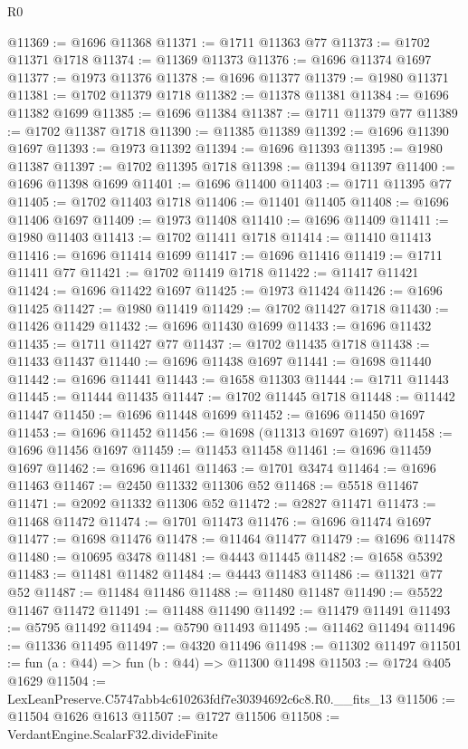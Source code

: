 \begin{lexlean}{R0}
\begin{coremodule}
@11369 := @1696 @11368
@11371 := @1711 @11363 @77
@11373 := @1702 @11371 @1718
@11374 := @11369 @11373
@11376 := @1696 @11374 @1697
@11377 := @1973 @11376
@11378 := @1696 @11377
@11379 := @1980 @11371
@11381 := @1702 @11379 @1718
@11382 := @11378 @11381
@11384 := @1696 @11382 @1699
@11385 := @1696 @11384
@11387 := @1711 @11379 @77
@11389 := @1702 @11387 @1718
@11390 := @11385 @11389
@11392 := @1696 @11390 @1697
@11393 := @1973 @11392
@11394 := @1696 @11393
@11395 := @1980 @11387
@11397 := @1702 @11395 @1718
@11398 := @11394 @11397
@11400 := @1696 @11398 @1699
@11401 := @1696 @11400
@11403 := @1711 @11395 @77
@11405 := @1702 @11403 @1718
@11406 := @11401 @11405
@11408 := @1696 @11406 @1697
@11409 := @1973 @11408
@11410 := @1696 @11409
@11411 := @1980 @11403
@11413 := @1702 @11411 @1718
@11414 := @11410 @11413
@11416 := @1696 @11414 @1699
@11417 := @1696 @11416
@11419 := @1711 @11411 @77
@11421 := @1702 @11419 @1718
@11422 := @11417 @11421
@11424 := @1696 @11422 @1697
@11425 := @1973 @11424
@11426 := @1696 @11425
@11427 := @1980 @11419
@11429 := @1702 @11427 @1718
@11430 := @11426 @11429
@11432 := @1696 @11430 @1699
@11433 := @1696 @11432
@11435 := @1711 @11427 @77
@11437 := @1702 @11435 @1718
@11438 := @11433 @11437
@11440 := @1696 @11438 @1697
@11441 := @1698 @11440
@11442 := @1696 @11441
@11443 := @1658 @11303
@11444 := @1711 @11443
@11445 := @11444 @11435
@11447 := @1702 @11445 @1718
@11448 := @11442 @11447
@11450 := @1696 @11448 @1699
@11452 := @1696 @11450 @1697
@11453 := @1696 @11452
@11456 := @1698 (@11313 @1697 @1697)
@11458 := @1696 @11456 @1697
@11459 := @11453 @11458
@11461 := @1696 @11459 @1697
@11462 := @1696 @11461
@11463 := @1701 @3474
@11464 := @1696 @11463
@11467 := @2450 @11332 @11306 @52
@11468 := @5518 @11467
@11471 := @2092 @11332 @11306 @52
@11472 := @2827 @11471
@11473 := @11468 @11472
@11474 := @1701 @11473
@11476 := @1696 @11474 @1697
@11477 := @1698 @11476
@11478 := @11464 @11477
@11479 := @1696 @11478
@11480 := @10695 @3478
@11481 := @4443 @11445
@11482 := @1658 @5392
@11483 := @11481 @11482
@11484 := @4443 @11483
@11486 := @11321 @77 @52
@11487 := @11484 @11486
@11488 := @11480 @11487
@11490 := @5522 @11467 @11472
@11491 := @11488 @11490
@11492 := @11479 @11491
@11493 := @5795 @11492
@11494 := @5790 @11493
@11495 := @11462 @11494
@11496 := @11336 @11495
@11497 := @4320 @11496
@11498 := @11302 @11497
@11501 := fun (a : @44) => fun (b : @44) => @11300 @11498
@11503 := @1724 @405 @1629
@11504 := LexLeanPreserve.C5747abb4c610263fdf7e30394692c6c8.R0.__fits_13
@11506 := @11504 @1626 @1613
@11507 := @1727 @11506
@11508 := VerdantEngine.ScalarF32.divideFinite

\end{coremodule}
\end{lexlean}

